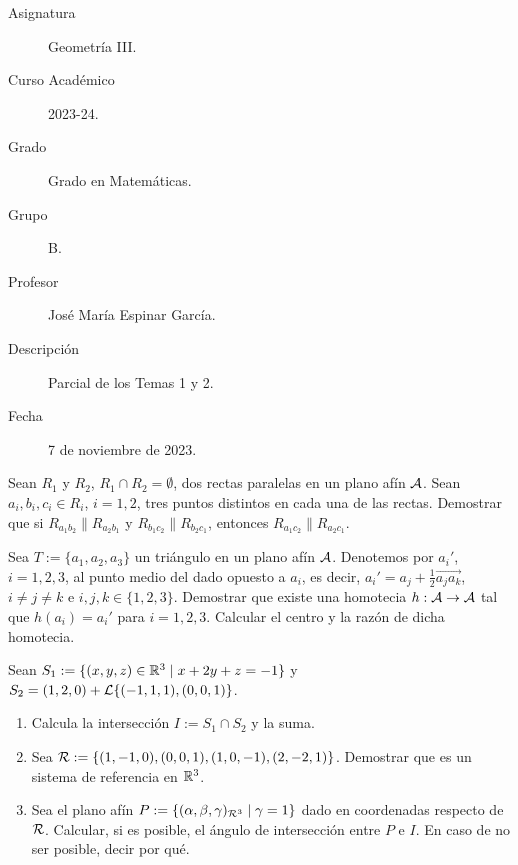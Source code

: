 \documentclass[12pt]{article}
\begin{document}

    
    

    \begin{description}
        \item[Asignatura] Geometría III.
        \item[Curso Académico] 2023-24.
        \item[Grado] Grado en Matemáticas.
        \item[Grupo] B.
        \item[Profesor] José María Espinar García.
        \item[Descripción] Parcial de los Temas 1 y 2.
        \item[Fecha] 7 de noviembre de 2023.
    
    \end{description}
    \newpage
    
    \begin{ejercicio}
        Sean $R_1$ y $R_2$, $R_1\cap R_2=\emptyset$, dos rectas paralelas en un plano afín $\mathcal{A}$. Sean $a_i,b_i,c_i\in R_i$, $i=1,2$, tres puntos distintos en cada una de las rectas. Demostrar que si $R_{a_1b_2}\|R_{a_2b_1}$ y $R_{b_1c_2}\|R_{b_2c_1}$, entonces $R_{a_1c_2}\|R_{a_2c_1}$.
    \end{ejercicio}

    \begin{ejercicio}
        Sea $T:=\{a_1,a_2,a_3\}$ un triángulo en un plano afín $\mathcal{A}$. Denotemos por $a_i'$, $i=1,2,3$, al punto medio del dado opuesto a $a_i$, es decir, $a_i'=a_j+\frac{1}{2}\vec{a_ja_k}$, $i\neq j\neq k$ e $i,j,k\in \{1,2,3\}$. Demostrar que existe una homotecia $h:\mathcal{A}\to \mathcal{A}$ tal que $h(a_i)=a_i'$ para $i=1,2,3$. Calcular el centro y la razón de dicha homotecia.
    \end{ejercicio}

    \begin{ejercicio}
        Sean $S_1:=\{(x,y,z)\in \mathbb{R}^3\mid x+2y+z=-1\}$ y $S_2=(1,2,0)+\mathcal{L}\{(-1,1,1), (0,0,1)\}$.
        \begin{enumerate}
            \item Calcula la intersección $I:=S_1\cap S_2$ y la suma.
            \item Sea $\mathcal{R}:=\{(1,-1,0), (0,0,1), (1,0,-1), (2,-2,1)\}$. Demostrar que es un sistema de referencia en $\mathbb{R}^3$.

            \item Sea el plano afín $P:= \{(\alpha,\beta,\gamma)_{\mathcal{R}^3}\mid \gamma=1\}$ dado en coordenadas respecto de $\mathcal{R}$. Calcular, si es posible, el ángulo de intersección entre $P$ e $I$. En caso de no ser posible, decir por qué.
        \end{enumerate}
    \end{ejercicio}
\end{document}
